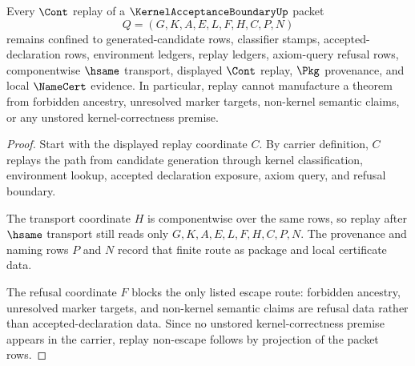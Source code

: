\begin{theorem}
\label{thm:kernel-acceptance-boundary-replay-nonescape}
Every $\Cont$ replay of a $\KernelAcceptanceBoundaryUp$ packet
$$
Q=(G,K,A,E,L,F,H,C,P,N)
$$
remains confined to generated-candidate rows, classifier stamps, accepted-declaration rows, environment ledgers, replay ledgers, axiom-query refusal rows, componentwise $\hsame$ transport, displayed $\Cont$ replay, $\Pkg$ provenance, and local $\NameCert$ evidence. In particular, replay cannot manufacture a theorem from forbidden ancestry, unresolved marker targets, non-kernel semantic claims, or any unstored kernel-correctness premise.
\end{theorem}
\begin{proof}
Start with the displayed replay coordinate $C$. By carrier definition, $C$ replays the path from candidate generation through kernel classification, environment lookup, accepted declaration exposure, axiom query, and refusal boundary.

The transport coordinate $H$ is componentwise over the same rows, so replay after $\hsame$ transport still reads only $G,K,A,E,L,F,H,C,P,N$. The provenance and naming rows $P$ and $N$ record that finite route as package and local certificate data.

The refusal coordinate $F$ blocks the only listed escape route: forbidden ancestry, unresolved marker targets, and non-kernel semantic claims are refusal data rather than accepted-declaration data. Since no unstored kernel-correctness premise appears in the carrier, replay non-escape follows by projection of the packet rows.
\end{proof}


\begin{closurestatus}{\KernelAcceptanceBoundaryUp}
  \theoryclosure{\seedClosure}
  \formalstatus{\unformalizedV}
\end{closurestatus}
